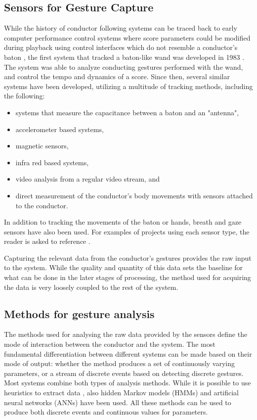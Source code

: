 \subsection{Sensors for Gesture Capture}

While the history of conductor following systems
can be traced back to
early computer performance control systems
where score parameters could be modified during playback
using control interfaces which do not resemble a conductor's baton \cite{Buxton1980},
the first system that tracked a baton-like wand
was developed in 1983 \cite{Haflich1983}.
The system was able to analyze conducting gestures performed with the wand,
and control the tempo and dynamics of a score.
Since then, several similar systems have been developed,
utilizing a multitude of tracking methods,
including the following:
\begin{itemize}
\item systems that measure the capacitance between a baton and an "antenna",
\item accelerometer based systems,
\item magnetic sensors,
\item infra red based systems,
\item video analysis from a regular video stream, and
\item direct measurement of the conductor's body movements with
sensors attached to the conductor.
\end{itemize}
In addition to tracking the movements of the baton or hands,
breath and gaze sensors have also been used.
For examples of projects using each sensor type,
the reader is asked to reference \cite{Fabiani2012}.

Capturing the relevant data from the conductor's gestures
provides the raw input to the system.
While the quality and quantity of this data
sets the baseline for what can be done
in the later stages of processing,
the method used for acquiring the data
is very loosely coupled to the rest of the system.

\subsection{Methods for gesture analysis}

The methods used for analysing the raw data
provided by the sensors define the
mode of interaction between the conductor and the system.
The most fundamental differentiation between different systems
can be made based on their mode of output:
whether the method produces
a set of continuously varying parameters,
or a stream of discrete events based on detecting discrete gestures.
Most systems combine both types of analysis methods.
While it is possible to use
heuristics to extract data \cite{Ilmonen1999, Morita1991},
also hidden Markov models (HMMs) \cite{Usa1998, Kolesnik2004, Lee2006} and
artificial neural networks (ANNs) \cite{Ilmonen1999, Bruegge2007}
have been used.
All these methods can be used to produce both discrete events
and continuous values for parameters.

